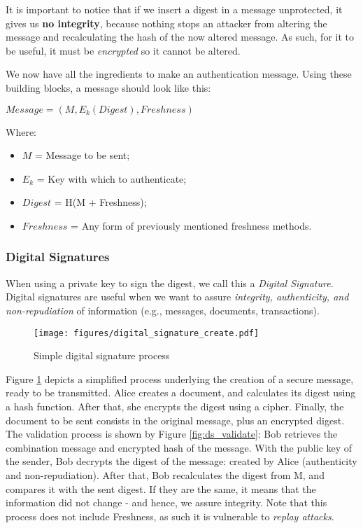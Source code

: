 \documentclass[12pt,a4paper]{article}
\theoremstyle{definition}
\begin{document}
It is important to notice that if we insert a digest in a message unprotected, it gives us \textbf{no integrity}, because nothing stops an attacker from altering the message and recalculating the hash of the now altered message. As such, for it to be useful, it must be \emph{encrypted} so it cannot be altered. 

We now have all the ingredients to make an authentication message. Using these building blocks, a message should look like this:

$Message = (M, E_k(Digest), Freshness)$

Where:
\begin{itemize}
    \item $M$ = Message to be sent;
    \item $E_k$ = Key with which to authenticate; 
    \item $Digest$ = H(M + Freshness);
    \item $Freshness$ = Any form of previously mentioned freshness methods.
\end{itemize}

\subsubsection{Digital Signatures}
When using a private key to sign the digest, we call this a \emph{Digital Signature}. Digital signatures are useful when we want to assure \emph{integrity, authenticity, and non-repudiation} of information (e.g., messages, documents, transactions).

\begin{figure}[h]
    \centering
    \texttt{[image: figures/digital\_signature\_create.pdf]}
    \caption{Simple digital signature process}
    \label{fig:ds_create}
\end{figure}

Figure \ref{fig:ds_create} depicts a simplified process underlying the creation of a secure message, ready to be transmitted. Alice creates a document, and calculates its digest using a hash function. After that, she encrypts the digest using a cipher. Finally, the document to be sent consists in the original message, plus an encrypted digest. The validation process is shown by Figure \ref{fig:ds_validate}: Bob retrieves the combination message and encrypted hash of the message. With the public key of the sender, Bob decrypts the digest of the message: created by Alice (authenticity and non-repudiation). After that, Bob recalculates the digest from M, and compares it with the sent digest. If they are the same, it means that the information did not change - and hence, we assure integrity. Note that this process does not include Freshness, as such it is vulnerable to \emph{replay attacks}.
\end{document}
